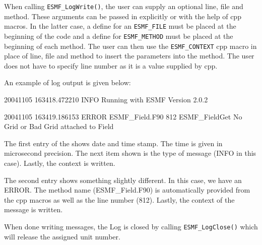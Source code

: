 When calling {\tt ESMF\_LogWrite()}, the user can supply an optional line,
file and method.  These arguments can be passed in explicitly or with the help
of cpp macros.  In the latter case, a define for an {\tt ESMF\_FILE} must be 
placed at the beginning of the code and a define for {\tt ESMF\_METHOD} must
be placed at the beginning of each method.  The user can then use the
{\tt ESMF\_CONTEXT} cpp macro in place of line, file and method to insert the 
parameters into the method.  The user does not have to specify line number as
it is a value supplied by cpp.

An example of log output is given below:

20041105 163418.472210 INFO      Running with ESMF Version 2.0.2   

20041105 163419.186153 ERROR     ESMF_Field.F90             812  ESMF_FieldGet
No Grid or Bad Grid attached to Field

The first entry of the shows date and time stamp.  The time is given in 
microsecond precision.  The next item shown is the type of message (INFO 
in this case).  Lastly, the context is written.

The second entry shows something slightly different.  In this case, we have
an ERROR.  The method name (ESMF\_Field.F90) is automatically provided from 
the cpp macros as well as the line number (812).  Lastly, the context of the 
message is written.
 
When done writing messages, the Log is closed by calling 
{\tt ESMF\_LogClose()} which will release the assigned unit number.




